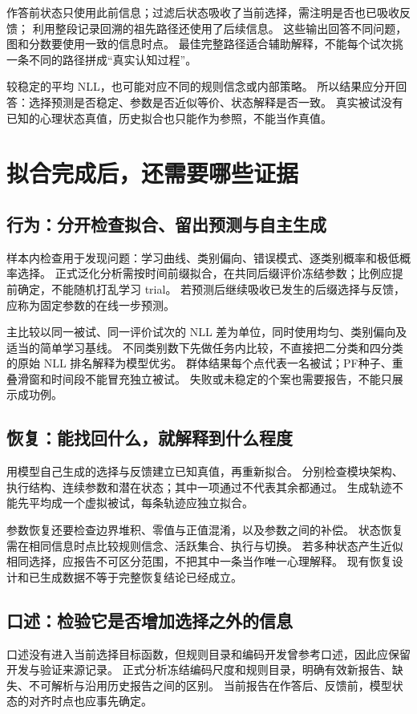 \documentclass[11pt]{article}
\begin{document}
作答前状态只使用此前信息；过滤后状态吸收了当前选择，需注明是否也已吸收反馈；
利用整段记录回溯的祖先路径还使用了后续信息。
这些输出回答不同问题，图和分数要使用一致的信息时点。
最佳完整路径适合辅助解释，不能每个试次挑一条不同的路径拼成“真实认知过程”。

较稳定的平均 NLL，也可能对应不同的规则信念或内部策略。
所以结果应分开回答：选择预测是否稳定、参数是否近似等价、状态解释是否一致。
真实被试没有已知的心理状态真值，历史拟合也只能作为参照，不能当作真值。

\section{拟合完成后，还需要哪些证据}
\subsection{行为：分开检查拟合、留出预测与自主生成}
样本内检查用于发现问题：学习曲线、类别偏向、错误模式、逐类别概率和极低概率选择。
正式泛化分析需按时间前缀拟合，在共同后缀评价冻结参数；比例应提前确定，不能随机打乱学习 trial。
若预测后继续吸收已发生的后缀选择与反馈，应称为固定参数的在线一步预测。

主比较以同一被试、同一评价试次的 NLL 差为单位，同时使用均匀、类别偏向及适当的简单学习基线。
不同类别数下先做任务内比较，不直接把二分类和四分类的原始 NLL 排名解释为模型优劣。
群体结果每个点代表一名被试；PF种子、重叠滑窗和时间段不能冒充独立被试。
失败或未稳定的个案也需要报告，不能只展示成功例。

\subsection{恢复：能找回什么，就解释到什么程度}
用模型自己生成的选择与反馈建立已知真值，再重新拟合。
分别检查模块架构、执行结构、连续参数和潜在状态；其中一项通过不代表其余都通过。
生成轨迹不能先平均成一个虚拟被试，每条轨迹应独立拟合。

参数恢复还要检查边界堆积、零值与正值混淆，以及参数之间的补偿。
状态恢复需在相同信息时点比较规则信念、活跃集合、执行与切换。
若多种状态产生近似相同选择，应报告不可区分范围，不把其中一条当作唯一心理解释。
现有恢复设计和已生成数据不等于完整恢复结论已经成立。

\subsection{口述：检验它是否增加选择之外的信息}
口述没有进入当前选择目标函数，但规则目录和编码开发曾参考口述，因此应保留开发与验证来源记录。
正式分析冻结编码尺度和规则目录，明确有效新报告、缺失、不可解析与沿用历史报告之间的区别。
当前报告在作答后、反馈前，模型状态的对齐时点也应事先确定。
\end{document}
